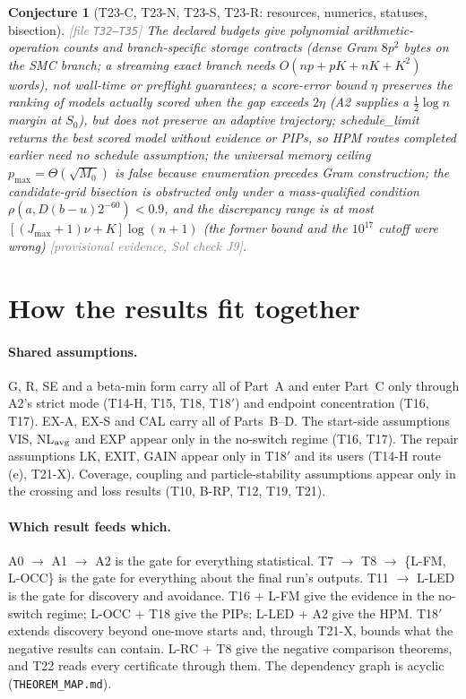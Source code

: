 \documentclass[11pt,a4paper]{article}
\theoremstyle{plain}
\newtheorem{conjecture}{Conjecture}[section]
\theoremstyle{definition}
\theoremstyle{remark}
\newcommand{\Sz}{S_0}
\newcommand{\code}[1]{\textsf{#1}}
\newcommand{\provisional}[1]{\textcolor{gray}{[provisional evidence, Sol check #1]}}
\newcommand{\thfile}[1]{\textcolor{gray}{\footnotesize[file \texttt{#1}]}}
\begin{document}
\begin{conjecture}[T23-C, T23-N, T23-S, T23-R: resources, numerics, statuses, bisection]\thfile{T32--T35}
The declared budgets give polynomial arithmetic-operation counts and branch-specific storage contracts (dense Gram $8p^2$ bytes on the SMC branch; a streaming exact branch needs $O(np+pK+nK+K^2)$ words), not wall-time or preflight guarantees; a score-error bound $\eta$ preserves the ranking of models actually scored when the gap exceeds $2\eta$ (A2 supplies a $\tfrac12\log n$ margin at $\Sz$), but does not preserve an adaptive trajectory; \code{schedule\_limit} returns the best scored model without evidence or PIPs, so HPM routes completed earlier need no schedule assumption; the universal memory ceiling $p_{\max}=\Theta(\sqrt{M_0})$ is false because enumeration precedes Gram construction; the candidate-grid bisection is obstructed only under a mass-qualified condition $\rho(a,D(b-u)2^{-60})<0.9$, and the discrepancy range is at most $[(J_{\max}+1)\nu+K]\log(n+1)$ (the former bound and the $10^{17}$ cutoff were wrong) \provisional{J9}.
\end{conjecture}

\section{How the results fit together}\label{sec:connections}

\paragraph{Shared assumptions.} G, R, SE and a beta-min form carry all of Part~A and enter Part~C only through A2's strict mode (T14-H, T15, T18, T18$'$) and endpoint concentration (T16, T17). EX-A, EX-S and CAL carry all of Parts~B--D. The start-side assumptions VIS, NL$_{\rm avg}$ and EXP appear only in the no-switch regime (T16, T17). The repair assumptions LK, EXIT, GAIN appear only in T18$'$ and its users (T14-H route (e), T21-X). Coverage, coupling and particle-stability assumptions appear only in the crossing and loss results (T10, B-RP, T12, T19, T21).

\paragraph{Which result feeds which.} A0 $\to$ A1 $\to$ A2 is the gate for everything statistical. T7 $\to$ T8 $\to$ \{L-FM, L-OCC\} is the gate for everything about the final run's outputs. T11 $\to$ L-LED is the gate for discovery and avoidance. T16 + L-FM give the evidence in the no-switch regime; L-OCC + T18 give the PIPs; L-LED + A2 give the HPM. T18$'$ extends discovery beyond one-move starts and, through T21-X, bounds what the negative results can contain. L-RC + T8 give the negative comparison theorems, and T22 reads every certificate through them. The dependency graph is acyclic (\texttt{THEOREM\_MAP.md}).
\end{document}
